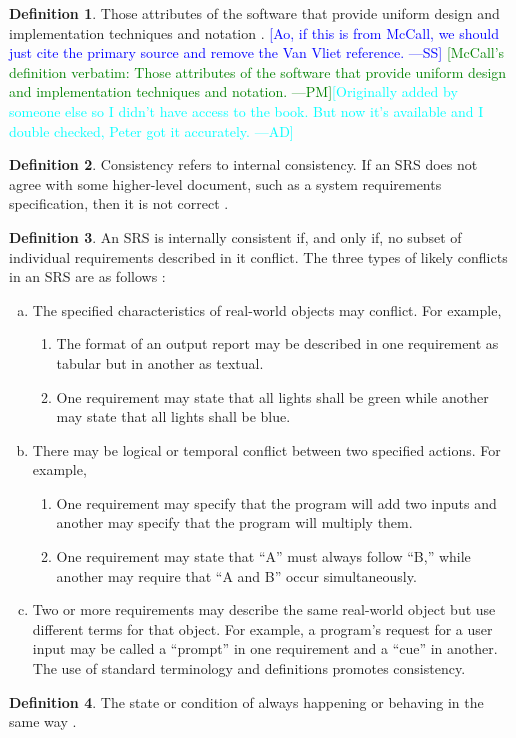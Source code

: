 \documentclass[letterpaper,cleveref]{lipics-v2019}
\newcommand{\authornote}[3]{\textcolor{#1}{[#3 ---#2]}}
\newcommand{\authornote}[3]{}
\newcommand{\wss}[1]{\authornote{blue}{SS}{#1}} %
\newcommand{\pmi}[1]{\authornote{green}{PM}{#1}} %
\newcommand{\ad}[1]{\authornote{cyan}{AD}{#1}} %
\theoremstyle{definition}
\newtheorem{defn}{Definition}
\begin{document}
\begin{defn}
  Those attributes of the software that provide uniform design and 
  implementation techniques and notation \citep{McCallEtAl1977}.  \wss{Ao, if 
  this is from McCall, we should just cite
    the primary source and remove the Van Vliet reference.} \pmi{McCall's 
    definition verbatim: Those attributes of the software that provide uniform 
    design and implementation techniques and notation.}\ad{Originally added 
  by someone else so I didn't have access to the book. But now it's available 
  and I double checked, Peter got it accurately.}
\end{defn}

\begin{defn}
Consistency refers to internal consistency. If an SRS does not agree with some
higher-level document, such as a system requirements specification, then it is
not correct \citep{IEEE1998}.
\end{defn}
\begin{defn}
An SRS is internally consistent if, and only if, no subset of individual
requirements described in it conflict. The three types of likely conflicts in an
SRS are as follows \citep{IEEE1998}:
	\begin{enumerate}[a)]
\item The specified characteristics of real-world objects may conflict. For
example,
	\begin{enumerate}[1)]
\item The format of an output report may be described in one requirement as
tabular but in another as textual.
\item One requirement may state that all lights shall be green while another may
state that all lights shall be blue.
	\end{enumerate}
\item There may be logical or temporal conflict between two specified actions.
For example,
	\begin{enumerate}[1)]
\item One requirement may specify that the program will add two inputs and
another may specify that the program will multiply them.
\item One requirement may state that “A” must always follow “B,” while another
may require that “A and B” occur simultaneously.
	\end{enumerate}
\item Two or more requirements may describe the same real-world object but use
different terms for that object. For example, a program’s request for a user
input may be called a “prompt” in one requirement and a “cue” in another. The
use of standard terminology and definitions promotes consistency.
	\end{enumerate}
\end{defn}
\begin{defn}
The state or condition of always happening or behaving in the same way
\citep{CambridgeConsistency2019}.
\end{defn}
\end{document}
